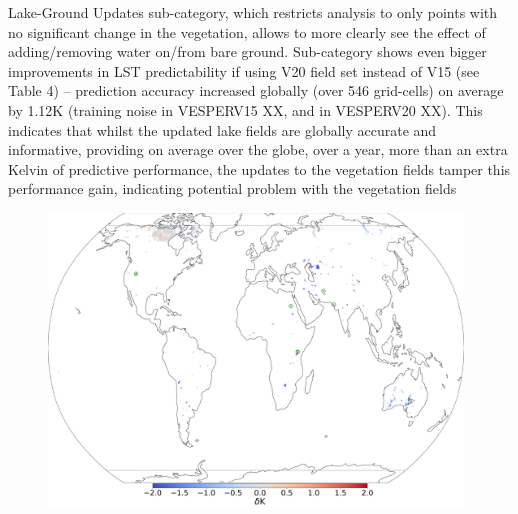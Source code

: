 \documentclass[hess, manuscript]{copernicus}
\begin{document}
Lake-Ground Updates sub-category, which restricts analysis to only points with no significant change in the vegetation, allows to more clearly see the effect of adding/removing water on/from bare ground. Sub-category shows even bigger improvements in LST predictability if using V20 field set instead of V15 (see Table 4) – prediction accuracy increased globally (over 546 grid-cells) on average by 1.12K (training noise in VESPERV15 XX, and in VESPERV20 XX). This indicates that whilst the updated lake fields are globally accurate and informative, providing on average over the globe, over a year, more than an extra Kelvin of predictive performance, the updates to the vegetation fields tamper this performance gain, indicating potential problem with the vegetation fields


\begin{figure}[t]
	\includegraphics[width=0.98\textwidth]{lake_haver.png}

\end{figure}
\end{document}
